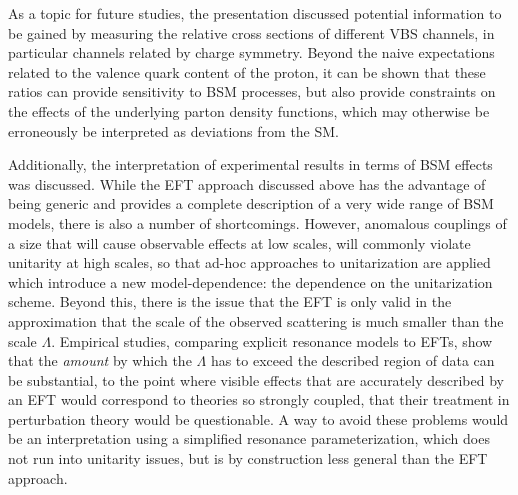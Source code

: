 As a topic for future studies, the presentation discussed potential information to be gained by measuring the relative cross sections of different VBS channels, in particular channels related by charge symmetry. Beyond the naive expectations related to the valence quark content of the proton, it can be shown that these ratios can provide sensitivity to BSM processes, but also provide constraints on the effects of the underlying parton density functions, which may otherwise be erroneously be interpreted as deviations from the SM.

Additionally, the interpretation of experimental results in terms of BSM effects was discussed. While the EFT approach discussed above has the advantage of being generic and provides a complete description of a very wide range of BSM models, there is also a number of shortcomings. However, anomalous couplings of a size that will cause observable effects at low scales, will  commonly violate unitarity at high scales, so that ad-hoc approaches to unitarization are applied which introduce a new model-dependence: the dependence on the unitarization scheme.
Beyond this, there is the issue that the EFT is only valid in the approximation that the scale of the observed scattering is much smaller than the scale $\Lambda$. Empirical studies, comparing explicit resonance models to EFTs, show that the \textit{amount} by which the $\Lambda$ has to exceed the described region of data can be substantial, to the point where visible effects that are accurately described by an EFT would correspond to theories so strongly coupled, that their treatment in perturbation theory would be questionable. A way to avoid these problems would be an interpretation using a simplified resonance parameterization, which does not run into unitarity issues, but is by construction less general than the EFT approach.



